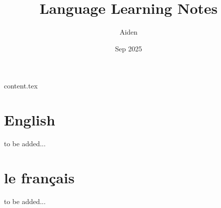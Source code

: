 \documentclass{book}
\begin{document}
\setcounter{tocdepth}{3}

\frontmatter

\title{Language Learning Notes}
\author{Aiden}
\date{Sep 2025}
\maketitle

\tableofcontents


\mainmatter

\part{}

{content.tex}


\part{English}

to be added...

\part{le français}

to be added...


\backmatter
\end{document}
